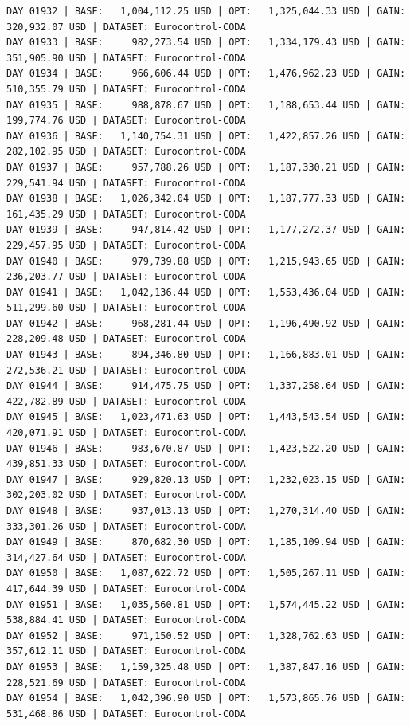 \documentclass[11pt,a4paper]{article}
\begin{document}
\begin{verbatim}
DAY 01932 | BASE:   1,004,112.25 USD | OPT:   1,325,044.33 USD | GAIN: 320,932.07 USD | DATASET: Eurocontrol-CODA
DAY 01933 | BASE:     982,273.54 USD | OPT:   1,334,179.43 USD | GAIN: 351,905.90 USD | DATASET: Eurocontrol-CODA
DAY 01934 | BASE:     966,606.44 USD | OPT:   1,476,962.23 USD | GAIN: 510,355.79 USD | DATASET: Eurocontrol-CODA
DAY 01935 | BASE:     988,878.67 USD | OPT:   1,188,653.44 USD | GAIN: 199,774.76 USD | DATASET: Eurocontrol-CODA
DAY 01936 | BASE:   1,140,754.31 USD | OPT:   1,422,857.26 USD | GAIN: 282,102.95 USD | DATASET: Eurocontrol-CODA
DAY 01937 | BASE:     957,788.26 USD | OPT:   1,187,330.21 USD | GAIN: 229,541.94 USD | DATASET: Eurocontrol-CODA
DAY 01938 | BASE:   1,026,342.04 USD | OPT:   1,187,777.33 USD | GAIN: 161,435.29 USD | DATASET: Eurocontrol-CODA
DAY 01939 | BASE:     947,814.42 USD | OPT:   1,177,272.37 USD | GAIN: 229,457.95 USD | DATASET: Eurocontrol-CODA
DAY 01940 | BASE:     979,739.88 USD | OPT:   1,215,943.65 USD | GAIN: 236,203.77 USD | DATASET: Eurocontrol-CODA
DAY 01941 | BASE:   1,042,136.44 USD | OPT:   1,553,436.04 USD | GAIN: 511,299.60 USD | DATASET: Eurocontrol-CODA
DAY 01942 | BASE:     968,281.44 USD | OPT:   1,196,490.92 USD | GAIN: 228,209.48 USD | DATASET: Eurocontrol-CODA
DAY 01943 | BASE:     894,346.80 USD | OPT:   1,166,883.01 USD | GAIN: 272,536.21 USD | DATASET: Eurocontrol-CODA
DAY 01944 | BASE:     914,475.75 USD | OPT:   1,337,258.64 USD | GAIN: 422,782.89 USD | DATASET: Eurocontrol-CODA
DAY 01945 | BASE:   1,023,471.63 USD | OPT:   1,443,543.54 USD | GAIN: 420,071.91 USD | DATASET: Eurocontrol-CODA
DAY 01946 | BASE:     983,670.87 USD | OPT:   1,423,522.20 USD | GAIN: 439,851.33 USD | DATASET: Eurocontrol-CODA
DAY 01947 | BASE:     929,820.13 USD | OPT:   1,232,023.15 USD | GAIN: 302,203.02 USD | DATASET: Eurocontrol-CODA
DAY 01948 | BASE:     937,013.13 USD | OPT:   1,270,314.40 USD | GAIN: 333,301.26 USD | DATASET: Eurocontrol-CODA
DAY 01949 | BASE:     870,682.30 USD | OPT:   1,185,109.94 USD | GAIN: 314,427.64 USD | DATASET: Eurocontrol-CODA
DAY 01950 | BASE:   1,087,622.72 USD | OPT:   1,505,267.11 USD | GAIN: 417,644.39 USD | DATASET: Eurocontrol-CODA
DAY 01951 | BASE:   1,035,560.81 USD | OPT:   1,574,445.22 USD | GAIN: 538,884.41 USD | DATASET: Eurocontrol-CODA
DAY 01952 | BASE:     971,150.52 USD | OPT:   1,328,762.63 USD | GAIN: 357,612.11 USD | DATASET: Eurocontrol-CODA
DAY 01953 | BASE:   1,159,325.48 USD | OPT:   1,387,847.16 USD | GAIN: 228,521.69 USD | DATASET: Eurocontrol-CODA
DAY 01954 | BASE:   1,042,396.90 USD | OPT:   1,573,865.76 USD | GAIN: 531,468.86 USD | DATASET: Eurocontrol-CODA

\end{verbatim}
\end{document}
